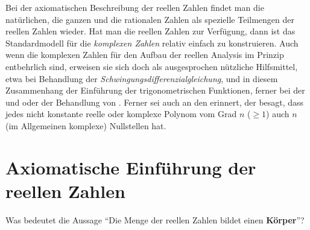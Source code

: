 Bei der axiomatischen Beschreibung der reellen Zahlen findet man die 
natürlichen, die ganzen und die rationalen Zahlen als spezielle 
Teilmengen der reellen Zahlen wieder. 
Hat man die reellen Zahlen zur Verfügung, dann ist das Standardmodell 
für die \textit{komplexen Zahlen} relativ einfach zu konstruieren. 
Auch wenn die komplexen Zahlen für den Aufbau der reellen Analysis im Prinzip 
entbehrlich sind, erweisen sie sich doch als ausgesprochen nützliche 
Hilfsmittel, etwa bei Behandlung der \textit{Schwingungsdifferenzialgleichung}, und in diesem Zusammenhang der Einführung der trigonometrischen Funktionen, 
ferner bei der  und 
 oder der Behandlung von . 
Ferner sei auch an den  erinnert, der 
besagt, dass jedes nicht konstante reelle oder komplexe Polynom vom Grad $n$ 
($\ge 1$) auch $n$ (im Allgemeinen komplexe) Nullstellen hat.

\section{Axiomatische Einführung der reellen Zahlen}

\begin{frage}
  \label{q:koerperaxiome}
  Was bedeutet die Aussage "`Die Menge der reellen Zahlen 
  bildet einen \textbf{Körper}"'?
\end{frage}

